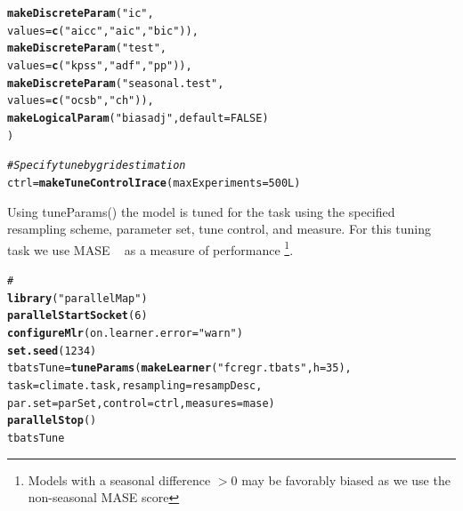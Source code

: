 \documentclass{article}\usepackage[]{graphicx}\usepackage[]{color}
\makeatletter
\newcommand{\hlnum}[1]{\textcolor[rgb]{0.686,0.059,0.569}{#1}}%
\newcommand{\hlstr}[1]{\textcolor[rgb]{0.192,0.494,0.8}{#1}}%
\newcommand{\hlcom}[1]{\textcolor[rgb]{0.678,0.584,0.686}{\textit{#1}}}%
\newcommand{\hlstd}[1]{\textcolor[rgb]{0.345,0.345,0.345}{#1}}%
\newcommand{\hlkwb}[1]{\textcolor[rgb]{0.69,0.353,0.396}{#1}}%
\newcommand{\hlkwc}[1]{\textcolor[rgb]{0.333,0.667,0.333}{#1}}%
\newcommand{\hlkwd}[1]{\textcolor[rgb]{0.737,0.353,0.396}{\textbf{#1}}}%
\newenvironment{kframe}{%
 \def\at@end@of@kframe{}%
 \ifinner\ifhmode%
  \def\at@end@of@kframe{\end{minipage}}%
  \begin{minipage}{\columnwidth}%
 \fi\fi%
 \def\FrameCommand##1{\hskip\@totalleftmargin \hskip-\fboxsep
 \colorbox{shadecolor}{##1}\hskip-\fboxsep
     \hskip-\linewidth \hskip-\@totalleftmargin \hskip\columnwidth}%
 \MakeFramed {\advance\hsize-\width
   \@totalleftmargin\z@ \linewidth\hsize
   \@setminipage}}%
 {\par\unskip\endMakeFramed%
 \at@end@of@kframe}
\newenvironment{knitrout}{}{} %
\theoremstyle{definition}
\newcommand\code{\@codex}
\def\@codex#1{{\normalfont\ttfamily\hyphenchar\font=-1 #1}}
\makeatother
\begin{document}
\begin{knitrout}
\begin{kframe}
\begin{alltt}
                     \hlkwd{makeDiscreteParam}\hlstd{(}\hlstr{"ic"}\hlstd{,}
                                       \hlkwc{values} \hlstd{=} \hlkwd{c}\hlstd{(}\hlstr{"aicc"}\hlstd{,}\hlstr{"aic"}\hlstd{,}\hlstr{"bic"}\hlstd{)),}
                     \hlkwd{makeDiscreteParam}\hlstd{(}\hlstr{"test"}\hlstd{,}
                                       \hlkwc{values} \hlstd{=} \hlkwd{c}\hlstd{(}\hlstr{"kpss"}\hlstd{,}\hlstr{"adf"}\hlstd{,}\hlstr{"pp"}\hlstd{)),}
                     \hlkwd{makeDiscreteParam}\hlstd{(}\hlstr{"seasonal.test"}\hlstd{,}
                                       \hlkwc{values} \hlstd{=} \hlkwd{c}\hlstd{(}\hlstr{"ocsb"}\hlstd{,} \hlstr{"ch"}\hlstd{)),}
                     \hlkwd{makeLogicalParam}\hlstd{(}\hlstr{"biasadj"}\hlstd{,} \hlkwc{default} \hlstd{=} \hlnum{FALSE}\hlstd{)}
                     \hlstd{)}

\hlcom{#Specify tune by grid estimation}
\hlstd{ctrl} \hlkwb{=} \hlkwd{makeTuneControlIrace}\hlstd{(}\hlkwc{maxExperiments} \hlstd{=} \hlnum{500L}\hlstd{)}
\end{alltt}
\end{kframe}
\end{knitrout}

Using \code{tuneParams()} the model is tuned for the task using the specified resampling scheme, parameter set, tune control, and measure. For this tuning task we use MASE ~\cite{Hyndman2006} as a measure of performance \footnote{Models with a seasonal difference $> 0$ may be favorably biased as we use the non-seasonal MASE score}.

\begin{knitrout}
\color{fgcolor}\begin{kframe}
\begin{alltt}
\hlcom{#}
\hlkwd{library}\hlstd{(}\hlstr{"parallelMap"}\hlstd{)}
\hlkwd{parallelStartSocket}\hlstd{(}\hlnum{6}\hlstd{)}
\hlkwd{configureMlr}\hlstd{(}\hlkwc{on.learner.error} \hlstd{=} \hlstr{"warn"}\hlstd{)}
\hlkwd{set.seed}\hlstd{(}\hlnum{1234}\hlstd{)}
\hlstd{tbatsTune} \hlkwb{=} \hlkwd{tuneParams}\hlstd{(}\hlkwd{makeLearner}\hlstd{(}\hlstr{"fcregr.tbats"}\hlstd{,} \hlkwc{h} \hlstd{=} \hlnum{35}\hlstd{),}
                       \hlkwc{task} \hlstd{= climate.task,} \hlkwc{resampling} \hlstd{= resampDesc,}
                       \hlkwc{par.set} \hlstd{= parSet,} \hlkwc{control} \hlstd{= ctrl,} \hlkwc{measures} \hlstd{= mase)}
\hlkwd{parallelStop}\hlstd{()}
\hlstd{tbatsTune}
\end{alltt}
\end{kframe}
\end{knitrout}
\end{document}
